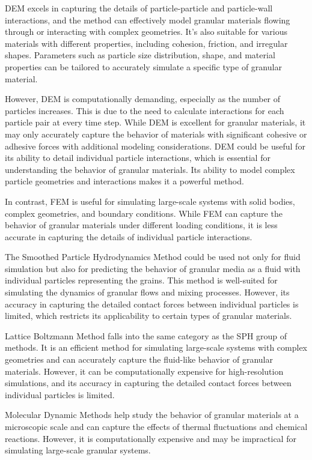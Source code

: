 DEM excels in capturing the details of particle-particle and particle-wall interactions, and the method can effectively model granular materials flowing through or interacting with complex geometries. It's also suitable for various materials with different properties, including cohesion, friction, and irregular shapes. Parameters such as particle size distribution, shape, and material properties can be tailored to accurately simulate a specific type of granular material.

However, DEM is computationally demanding, especially as the number of particles increases. This is due to the need to calculate interactions for each particle pair at every time step. While DEM is excellent for granular materials, it may only accurately capture the behavior of materials with significant cohesive or adhesive forces with additional modeling considerations. DEM could be useful for its ability to detail individual particle interactions, which is essential for understanding the behavior of granular materials. Its ability to model complex particle geometries and interactions makes it a powerful method. 

In contrast, FEM is useful for simulating large-scale systems with solid bodies, complex geometries, and boundary conditions. While FEM can capture the behavior of granular materials under different loading conditions, it is less accurate in capturing the details of individual particle interactions.

The Smoothed Particle Hydrodynamics Method could be used not only for fluid simulation but also for predicting the behavior of granular media as a fluid with individual particles representing the grains. This method is well-suited for simulating the dynamics of granular flows and mixing processes. However, its accuracy in capturing the detailed contact forces between individual particles is limited, which restricts its applicability to certain types of granular materials.

Lattice Boltzmann Method falls into the same category as the SPH group of methods. It is an efficient method for simulating large-scale systems with complex geometries and can accurately capture the fluid-like behavior of granular materials. However, it can be computationally expensive for high-resolution simulations, and its accuracy in capturing the detailed contact forces between individual particles is limited.

Molecular Dynamic Methods help study the behavior of granular materials at a microscopic scale and can capture the effects of thermal fluctuations and chemical reactions. However, it is computationally expensive and may be impractical for simulating large-scale granular systems.

